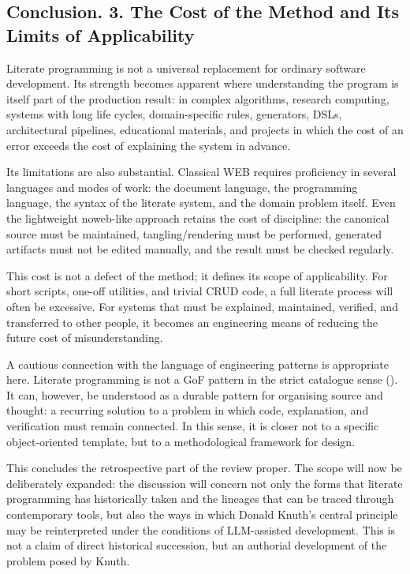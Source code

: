 \documentclass{ZGJournalArticle_2026}
\begin{document}
\subsection{Conclusion. 3. The Cost of the Method and Its Limits of
Applicability}\label{conclusion.-3.-the-cost-of-the-method-and-its-limits-of-applicability}

Literate programming is not a universal replacement for ordinary
software development. Its strength becomes apparent where understanding
the program is itself part of the production result: in complex
algorithms, research computing, systems with long life cycles,
domain-specific rules, generators, DSLs, architectural pipelines,
educational materials, and projects in which the cost of an error
exceeds the cost of explaining the system in advance.

Its limitations are also substantial. Classical WEB requires proficiency
in several languages and modes of work: the document language, the
programming language, the syntax of the literate system, and the domain
problem itself. Even the lightweight noweb-like approach retains the
cost of discipline: the canonical source must be maintained,
tangling/rendering must be performed, generated artifacts must not be
edited manually, and the result must be checked regularly.

This cost is not a defect of the method; it defines its scope of
applicability. For short scripts, one-off utilities, and trivial CRUD
code, a full literate process will often be excessive. For systems that
must be explained, maintained, verified, and transferred to other
people, it becomes an engineering means of reducing the future cost of
misunderstanding.

A cautious connection with the language of engineering patterns is
appropriate here. Literate programming is not a GoF pattern in the
strict catalogue sense (). It can, however, be understood as a durable pattern for
organising source and thought: a recurring solution to a problem in
which code, explanation, and verification must remain connected. In this
sense, it is closer not to a specific object-oriented template, but to a
methodological framework for design.

This concludes the retrospective part of the review proper. The scope
will now be deliberately expanded: the discussion will concern not only
the forms that literate programming has historically taken and the
lineages that can be traced through contemporary tools, but also the
ways in which Donald Knuth's central principle may be reinterpreted
under the conditions of LLM-assisted development. This is not a claim of
direct historical succession, but an authorial development of the
problem posed by Knuth.
\end{document}
